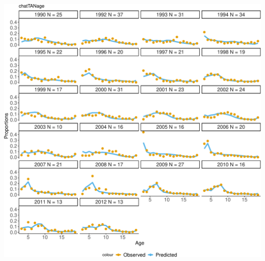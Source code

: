 \documentclass[
]{book}
\begin{document}
\includegraphics{_main_files/figure-latex/plot_comp_fit-1.pdf}
\end{document}
